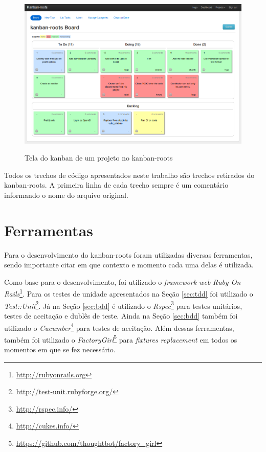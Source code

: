 \begin{figure}[h]
  \center
  \caption{Tela do kanban de um projeto no kanban-roots}
  \includegraphics[scale=0.45]{images/kanban-roots}
  \label{img:tela_kaban_roots}
\end{figure}

Todos os trechos de código apresentados neste trabalho são trechos retirados do kanban-roots. A primeira linha de cada trecho sempre é um comentário informando o nome do arquivo original.

\section{Ferramentas}

Para o desenvolvimento do kanban-roots foram utilizadas diversas ferramentas, sendo importante citar em que contexto e momento cada uma delas é utilizada.

Como base para o desenvolvimento, foi utilizado o \textit{framework web} \textit{Ruby On Rails}\footnote{\url{http://rubyonrails.org}}. Para os testes de unidade apresentados na Seção \ref{sec:tdd} foi utilizado o \textit{Test::Unit}\footnote{\url{http://test-unit.rubyforge.org/}}. Já na Seção \ref{sec:bdd} é utilizado o \textit{Rspec}\footnote{\url{http://rspec.info/}} para testes unitários, testes de aceitação e dublês de teste. Ainda na Seção \ref{sec:bdd} também foi utilizado o \textit{Cucumber}\footnote{\url{http://cukes.info/}} para testes de aceitação. Além dessas ferramentas, também foi utilizado o \textit{FactoryGirl}\footnote{\url{https://github.com/thoughtbot/factory_girl}} para \textit{fixtures replacement} em todos os momentos em que se fez necessário.